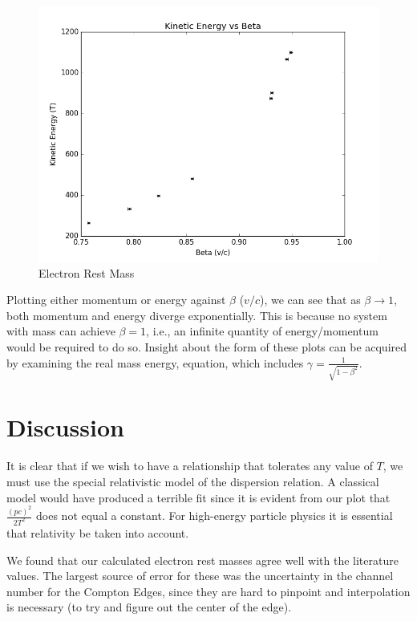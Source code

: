 \documentclass{article}
\begin{document}
\begin{figure}[!htb]
	\centering
	\includegraphics[scale=0.75]{plots/T_beta.png}
  	\caption{Electron Rest Mass} 
 	\label{calibration}
\end{figure}

\hspace{.25cm}
Plotting either momentum or energy against $\beta$ ($v/c$), we can see that as $\beta \rightarrow 1$, both momentum and energy diverge exponentially. This is because no system with mass can achieve $\beta = 1$, i.e., an infinite quantity of energy/momentum would be required to do so. Insight about the form of these plots can be acquired by examining the real mass energy, equation, which includes $\gamma = \frac{1}{\sqrt{1 - \beta^2}}$.

\clearpage
\newpage
\section{Discussion}

It is clear that if we wish to have a relationship that tolerates any value of $T$, we must use the special relativistic model of the dispersion relation. A classical model would have produced a terrible fit since it is evident from our plot that $\frac{(pc)^2}{2T^2}$ does not equal a constant. For high-energy particle physics it is essential that relativity be taken into account.

We found that our calculated electron rest masses agree well with the literature values. The largest source of error for these was the uncertainty in the channel number for the Compton Edges, since they are hard to pinpoint and interpolation is necessary (to try and figure out the center of the edge).
\end{document}

